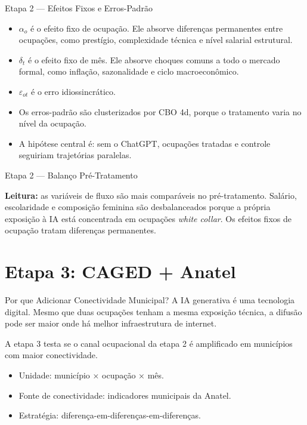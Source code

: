 \documentclass[
  ignorenonframetext,
  aspectratio=169,
]{beamer}
\providecommand{\tightlist}{%
  \setlength{\itemsep}{0pt}\setlength{\parskip}{0pt}}
\begin{document}
\begin{frame}{Etapa 2 --- Efeitos Fixos e Erros-Padrão}
\label{etapa-2-efeitos-fixos-e-erros-padruxe3o}
\begin{itemize}
\tightlist
\item
  \(\alpha_o\) é o efeito fixo de ocupação. Ele absorve diferenças
  permanentes entre ocupações, como prestígio, complexidade técnica e
  nível salarial estrutural.
\item
  \(\delta_t\) é o efeito fixo de mês. Ele absorve choques comuns a todo
  o mercado formal, como inflação, sazonalidade e ciclo macroeconômico.
\item
  \(\varepsilon_{ot}\) é o erro idiossincrático.
\item
  Os erros-padrão são clusterizados por CBO 4d, porque o tratamento
  varia no nível da ocupação.
\item
  A hipótese central é: sem o ChatGPT, ocupações tratadas e controle
  seguiriam trajetórias paralelas.
\end{itemize}
\end{frame}

\begin{frame}{Etapa 2 --- Balanço Pré-Tratamento}
\label{etapa-2-balanuxe7o-pruxe9-tratamento}
\begin{center}
\resizebox{0.90\textwidth}{!}{}
\end{center}

\vspace{0.15cm}

\textbf{Leitura:} as variáveis de fluxo são mais comparáveis no
pré-tratamento. Salário, escolaridade e composição feminina são
desbalanceados porque a própria exposição à IA está concentrada em
ocupações \emph{white collar}. Os efeitos fixos de ocupação tratam
diferenças permanentes.
\end{frame}

\section{Etapa 3: CAGED + Anatel}\label{etapa-3-caged-anatel}

\begin{frame}{Por que Adicionar Conectividade Municipal?}
\label{por-que-adicionar-conectividade-municipal}
A IA generativa é uma tecnologia digital. Mesmo que duas ocupações
tenham a mesma exposição técnica, a difusão pode ser maior onde há
melhor infraestrutura de internet.

A etapa 3 testa se o canal ocupacional da etapa 2 é amplificado em
municípios com maior conectividade.

\begin{itemize}
\tightlist
\item
  Unidade: município × ocupação × mês.
\item
  Fonte de conectividade: indicadores municipais da Anatel.
\item
  Estratégia: diferença-em-diferenças-em-diferenças.
\end{itemize}
\end{frame}
\end{document}
